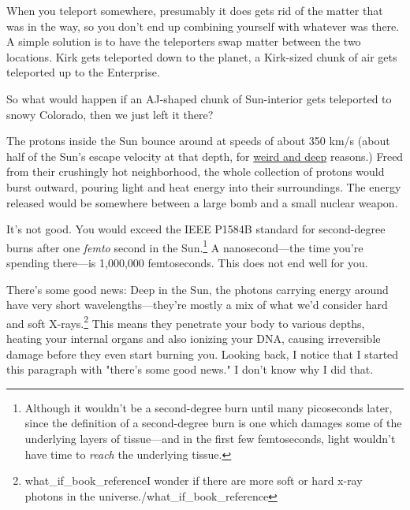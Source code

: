 {{{{When you teleport somewhere, presumably it does gets rid of the matter that was in the way, so you don't end up combining yourself with whatever was there. A simple solution is to have the teleporters swap matter between the two locations. Kirk gets teleported down to the planet, a Kirk-sized chunk of air gets teleported up to the Enterprise.

So what would happen if an AJ-shaped chunk of Sun-interior gets teleported to snowy Colorado, then we just left it there?

The protons inside the Sun bounce around at speeds of about 350 km/s (about half of the Sun's escape velocity at that depth, for \href{http://en.wikipedia.org/wiki/Virial\_theorem}{weird and deep} reasons.) Freed from their crushingly hot neighborhood, the whole collection of protons would burst outward, pouring light and heat energy into their surroundings. The energy released would be somewhere between a large bomb and a small nuclear weapon.} } It's not good. You would exceed the IEEE P1584B standard for second-degree burns after one \emph{femto} second in the Sun.{\footnote{Although it wouldn't be a second-degree burn until many picoseconds later, since the definition of a second-degree burn is one which damages some of the underlying layers of tissue—and in the first few femtoseconds, light wouldn't have time to \emph{reach} the underlying tissue.} } A nanosecond—the time you're spending there—is 1,000,000 femtoseconds. This does not end well for you.}

{There's some good news: Deep in the Sun, the photons carrying energy around have very short wavelengths—they're mostly a mix of what we'd consider hard and soft X-rays.{\footnote{what\_if\_book\_referenceI wonder if there are more soft or hard x-ray photons in the universe./what\_if\_book\_reference} } This means they penetrate your body to various depths, heating your internal organs and also ionizing your DNA, causing irreversible damage before they even start burning you. Looking back, I notice that I started this paragraph with "there's some good news." I don't know why I did that.}

}
